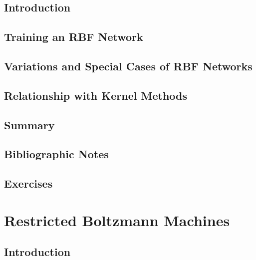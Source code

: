 \documentclass[a4paper]{article}
\begin{document}
\subsection{Introduction}

\subsection{Training an RBF Network}

\subsection{Variations and Special Cases of RBF Networks}

\subsection{Relationship with Kernel Methods}

\subsection{Summary}

\subsection{Bibliographic Notes}

\subsection{Exercises}

\newpage
\section{Restricted Boltzmann Machines}
\subsection{Introduction}

\end{document}

